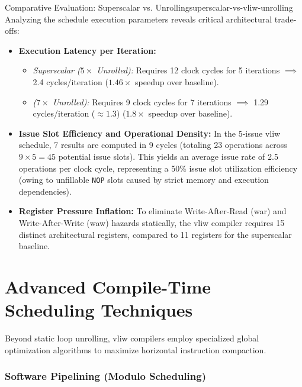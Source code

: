 \begin{observation}{Comparative Evaluation: Superscalar vs.  Unrolling}{superscalar-vs-vliw-unrolling}
Analyzing the schedule execution parameters reveals critical architectural trade-offs:
\begin{itemize}
    \item \textbf{Execution Latency per Iteration:}
    \begin{itemize}
        \item \textit{Superscalar ($5\times$ Unrolled):} Requires 12 clock cycles for 5 iterations $\implies$ 2.4 cycles/iteration ($1.46\times$ speedup over baseline).
        \item \textit{ ($7\times$ Unrolled):} Requires 9 clock cycles for 7 iterations $\implies$ 1.29 cycles/iteration ($\approx 1.3$) ($1.8\times$ speedup over baseline).
    \end{itemize}
    \item \textbf{Issue Slot Efficiency and Operational Density:}
    In the 5-issue \gls{vliw} schedule, 7 results are computed in 9 cycles (totaling 23 operations across $9 \times 5 = 45$ potential issue slots). This yields an average issue rate of 2.5 operations per clock cycle, representing a 50\% issue slot utilization efficiency (owing to unfillable \texttt{NOP} slots caused by strict memory and execution dependencies).
    \item \textbf{Register Pressure Inflation:}
    To eliminate Write-After-Read (\gls{war}) and Write-After-Write (\gls{waw}) hazards statically, the \gls{vliw} compiler requires 15 distinct architectural registers, compared to 11 registers for the superscalar baseline.
\end{itemize}
\end{observation}

\section{Advanced Compile-Time Scheduling Techniques}
\label{sec:advanced_vliw_compiler_techniques}

Beyond static loop unrolling, \gls{vliw} compilers employ specialized global optimization algorithms to maximize horizontal instruction compaction.

\subsubsection{Software Pipelining (Modulo Scheduling)}

